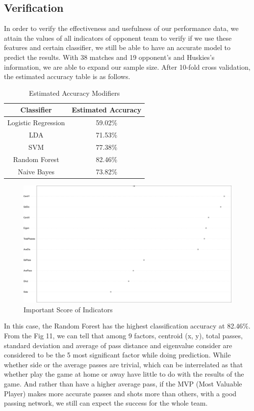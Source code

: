 \documentclass{mcmthesis}
\begin{document}
\subsection{Verification}
In order to verify the effectiveness and usefulness of our performance data, we attain the values of all indicators of opponent team to verify if we use these features and certain classifier, we still be able to have an accurate model to predict the results. With 38 matches and 19 opponent’s and Huskies’s information, we are able to expand our sample size. After 10-fold cross validation, the estimated accuracy table is as follows.
\begin{table}[thb]
\caption{Estimated Accuracy Modifiers}
\begin{center}
\begin{tabular}{ c c }
\hline
Classifier&Estimated Accuracy\\
\hline
Logistic Regression& 59.02\%\\
LDA&71.53\%\\
SVM&77.38\%\\
Random Forest &82.46\%\\
Naive Bayes & 73.82\%\\
\hline
\end{tabular}
\end{center}
\end{table}
\begin{figure}[h!]
\begin{center}
\includegraphics[width=.6\textwidth]{F10_3.pdf}
\caption{Important Score of Indicators}
\end{center}
\end{figure}
In this case, the Random Forest has the highest classification accuracy at 82.46\%. From the Fig 11, we can tell that among 9 factors, centroid (x, y), total passes, standard deviation and average of pass distance and eigenvalue consider are considered to be the 5 most significant factor while doing prediction. While whether side or the average passes are trivial, which can be interrelated as that whether play the game at home or away have little to do with the results of the game. And rather than have a higher average pass, if the MVP (Most Valuable Player) makes more accurate passes and shots more than others, with a good passing network, we still can expect the success for the whole team.
\end{document}
